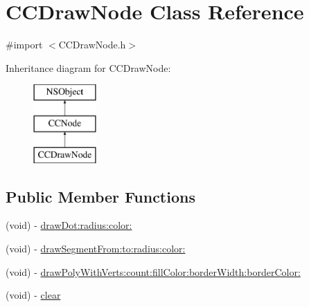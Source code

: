 \hypertarget{interface_c_c_draw_node}{\section{C\-C\-Draw\-Node Class Reference}
\label{interface_c_c_draw_node}
}


{\ttfamily \#import $<$C\-C\-Draw\-Node.\-h$>$}

Inheritance diagram for C\-C\-Draw\-Node\-:\begin{figure}[H]
\begin{center}
\leavevmode
\includegraphics[height=3.000000cm]{interface_c_c_draw_node}
\end{center}
\end{figure}
\subsection*{Public Member Functions}
\begin{DoxyCompactItemize}
\item 
(void) -\/ \hyperlink{interface_c_c_draw_node_a5b9e1f35b31c70ffde2492b37b7fc25a}{draw\-Dot\-:radius\-:color\-:}
\item 
(void) -\/ \hyperlink{interface_c_c_draw_node_aa25b3af4ce06706578938d8387178858}{draw\-Segment\-From\-:to\-:radius\-:color\-:}
\item 
(void) -\/ \hyperlink{interface_c_c_draw_node_a8c42e649ebddd6fc7476e6087a8c0c6c}{draw\-Poly\-With\-Verts\-:count\-:fill\-Color\-:border\-Width\-:border\-Color\-:}
\item 
(void) -\/ \hyperlink{interface_c_c_draw_node_aa9bddcfd40ab5a8f6fffd2771e94e401}{clear}
\end{DoxyCompactItemize}
